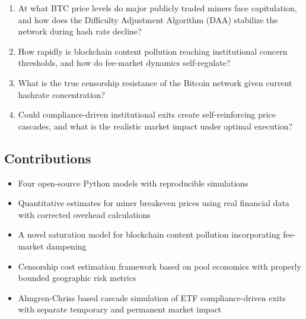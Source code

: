 \documentclass[
  11pt,
]{article}
\providecommand{\tightlist}{%
  \setlength{\itemsep}{0pt}\setlength{\parskip}{0pt}}\usepackage{longtable,booktabs,array}
\let\oldsubsection\subsection
\renewcommand{\subsection}[1]{\FloatBarrier\oldsubsection{#1}}
\begin{document}
\begin{enumerate}
\def\labelenumi{\arabic{enumi}.}
\tightlist
\item
  At what BTC price levels do major publicly traded miners face
  capitulation, and how does the Difficulty Adjustment Algorithm (DAA)
  stabilize the network during hash rate decline?
\item
  How rapidly is blockchain content pollution reaching institutional
  concern thresholds, and how do fee-market dynamics self-regulate?
\item
  What is the true censorship resistance of the Bitcoin network given
  current hashrate concentration?
\item
  Could compliance-driven institutional exits create self-reinforcing
  price cascades, and what is the realistic market impact under optimal
  execution?
\end{enumerate}

\hypertarget{contributions}{%
\subsection{Contributions}\label{contributions}}

\begin{itemize}
\tightlist
\item
  Four open-source Python models with reproducible simulations
\item
  Quantitative estimates for miner breakeven prices using real financial
  data with corrected overhead calculations
\item
  A novel saturation model for blockchain content pollution
  incorporating fee-market dampening
\item
  Censorship cost estimation framework based on pool economics with
  properly bounded geographic risk metrics
\item
  Almgren-Chriss based cascade simulation of ETF compliance-driven exits
  with separate temporary and permanent market impact
\end{itemize}
\end{document}
